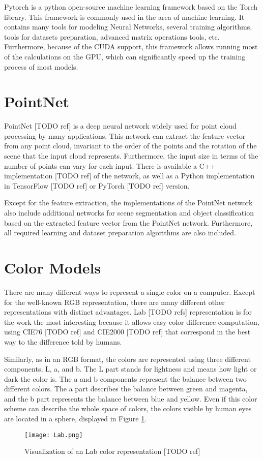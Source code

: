 Pytorch is a python open-source machine learning framework based on the Torch library. This framework is commonly used in the area of machine learning. It contains many tools for modeling Neural Networks, several training algorithms, tools for datasets preparation, advanced matrix operations tools, etc. Furthermore, because of the CUDA support, this framework allows running most of the calculations on the GPU, which can significantly speed up the training process of most models.

\section{PointNet}

PointNet [TODO ref] is a deep neural network widely used for point cloud processing by many applications. This network can extract the feature vector from any point cloud, invariant to the order of the points and the rotation of the scene that the input cloud represents. Furthermore, the input size in terms of the number of points can vary for each input. There is available a C++ implementation [TODO ref] of the network, as well as a Python implementation in TensorFlow [TODO ref] or PyTorch [TODO ref] version.\par
Except for the feature extraction, the implementations of the PointNet network also include additional networks for scene segmentation and object classification based on the extracted feature vector from the PointNet network. Furthermore, all required learning and dataset preparation algorithms are also included.

\section{Color Models}

There are many different ways to represent a single color on a computer. Except for the well-known RGB representation, there are many different other representations with distinct advantages. Lab [TODO refs] representation is for the work the most interesting because it allows easy color difference computation, using CIE76 [TODO ref] and CIE2000 [TODO ref] that correspond in the best way to the difference told by humans.\par
Similarly, as in an RGB format, the colors are represented using three different components, L, a, and b. The L part stands for lightness and means how light or dark the color is. The a and b components represent the balance between two different colors. The a part describes the balance between green and magenta, and the b part represents the balance between blue and yellow. Even if this color scheme can describe the whole space of colors, the colors visible by human eyes are located in a sphere, displayed in Figure \ref{fig:labscheme}.

\begin{figure}[htpb]
    \centering
    \texttt{[image: Lab.png]}
    \caption{Visualization of an Lab color representation [TODO ref]} \label{fig:labscheme}
\end{figure}
